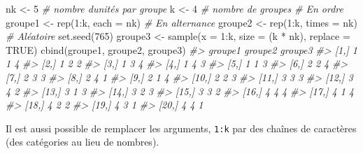 \documentclass[
]{book}
\newenvironment{Shaded}{}{}
\newcommand{\AttributeTok}[1]{#1}
\newcommand{\CommentTok}[1]{\textit{#1}}
\newcommand{\ConstantTok}[1]{#1}
\newcommand{\DecValTok}[1]{#1}
\newcommand{\FunctionTok}[1]{#1}
\newcommand{\NormalTok}[1]{#1}
\newcommand{\OtherTok}[1]{#1}
\newcommand{\SpecialCharTok}[1]{#1}
\begin{document}
\begin{Shaded}
\begin{Highlighting}[]
\NormalTok{nk }\OtherTok{\textless{}{-}} \DecValTok{5} \CommentTok{\# nombre d\textquotesingle{}unités par groupe}
\NormalTok{k }\OtherTok{\textless{}{-}} \DecValTok{4}  \CommentTok{\# nombre de groupes}
\CommentTok{\# En ordre}
\NormalTok{groupe1 }\OtherTok{\textless{}{-}} \FunctionTok{rep}\NormalTok{(}\DecValTok{1}\SpecialCharTok{:}\NormalTok{k, }\AttributeTok{each =}\NormalTok{ nk)}
\CommentTok{\# En alternance}
\NormalTok{groupe2 }\OtherTok{\textless{}{-}} \FunctionTok{rep}\NormalTok{(}\DecValTok{1}\SpecialCharTok{:}\NormalTok{k, }\AttributeTok{times =}\NormalTok{ nk)}
\CommentTok{\# Aléatoire}
\FunctionTok{set.seed}\NormalTok{(}\DecValTok{765}\NormalTok{)}
\NormalTok{groupe3 }\OtherTok{\textless{}{-}} \FunctionTok{sample}\NormalTok{(}\AttributeTok{x =} \DecValTok{1}\SpecialCharTok{:}\NormalTok{k, }\AttributeTok{size =}\NormalTok{ (k }\SpecialCharTok{*}\NormalTok{ nk), }\AttributeTok{replace =} \ConstantTok{TRUE}\NormalTok{)}
\FunctionTok{cbind}\NormalTok{(groupe1, groupe2, groupe3)}
\CommentTok{\#\textgreater{}       groupe1 groupe2 groupe3}
\CommentTok{\#\textgreater{}  [1,]       1       1       4}
\CommentTok{\#\textgreater{}  [2,]       1       2       2}
\CommentTok{\#\textgreater{}  [3,]       1       3       4}
\CommentTok{\#\textgreater{}  [4,]       1       4       3}
\CommentTok{\#\textgreater{}  [5,]       1       1       3}
\CommentTok{\#\textgreater{}  [6,]       2       2       4}
\CommentTok{\#\textgreater{}  [7,]       2       3       3}
\CommentTok{\#\textgreater{}  [8,]       2       4       1}
\CommentTok{\#\textgreater{}  [9,]       2       1       4}
\CommentTok{\#\textgreater{} [10,]       2       2       3}
\CommentTok{\#\textgreater{} [11,]       3       3       3}
\CommentTok{\#\textgreater{} [12,]       3       4       2}
\CommentTok{\#\textgreater{} [13,]       3       1       3}
\CommentTok{\#\textgreater{} [14,]       3       2       3}
\CommentTok{\#\textgreater{} [15,]       3       3       2}
\CommentTok{\#\textgreater{} [16,]       4       4       4}
\CommentTok{\#\textgreater{} [17,]       4       1       4}
\CommentTok{\#\textgreater{} [18,]       4       2       2}
\CommentTok{\#\textgreater{} [19,]       4       3       1}
\CommentTok{\#\textgreater{} [20,]       4       4       1}
\end{Highlighting}
\end{Shaded}

Il est aussi possible de remplacer les arguments, \texttt{1:k} par des chaînes de caractères (des catégories au lieu de nombres).
\end{document}
